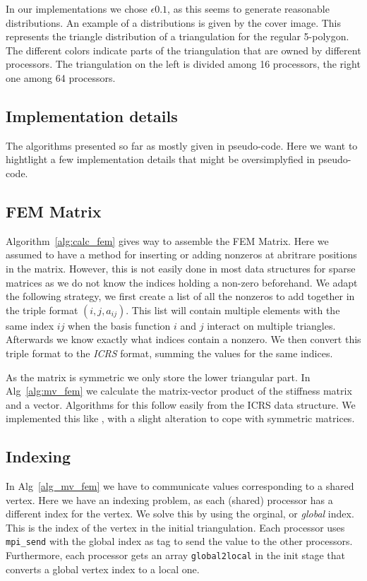 \documentclass[11pt]{amsart}
\theoremstyle{definition}
\begin{document}
In our implementations we chose $\epsilon 0.1$, as this seems to generate reasonable distributions. An example of a distributions is given by the cover image. This represents the triangle distribution of a triangulation for the  regular 5-polygon. The different colors indicate parts of the triangulation that are owned by different processors. The triangulation on the left is divided among 16 processors, the right one among 64 processors. 
\subsection{Implementation details}
The algorithms presented so far as mostly given in pseudo-code. Here we want to hightlight a few implementation details that might be oversimplyfied in pseudo-code.
\subsection*{FEM Matrix}
Algorithm~\ref{alg:calc_fem} gives way to assemble the FEM Matrix. Here
we assumed to have a method for inserting or adding nonzeros at abritrare positions in the matrix. However,
this is not easily done in most data structures for sparse matrices as we do not know the
indices holding a non-zero beforehand. We adapt the following strategy, we first create a list
of all the nonzeros to add together in the triple format $(i,j,a_{ij})$.
This list will contain multiple elements with the same index $ij$ when
the basis function $i$ and $j$ interact on multiple triangles. Afterwards we know
exactly what indices contain a nonzero. We then convert this triple format to the \emph{ICRS}
\cite[p.~171]{biss04} format, summing the values for the same indices.

As the matrix is symmetric we only store the lower triangular part. In Alg~\ref{alg:mv_fem}
we calculate the matrix-vector product of the stiffness matrix and a vector. Algorithms for this
follow easily from the ICRS data structure. We implemented this like \cite[Algorithm~4.4]{biss04}, with
a slight alteration to cope with symmetric matrices.

\subsection*{Indexing}
In Alg~\ref{alg_mv_fem} we have to communicate values corresponding to a shared vertex. Here we have an indexing problem, as each (shared) processor has a different index for the vertex. We solve this by using the orginal, or \emph{global} index. This is the index of the vertex in the initial triangulation. Each processor uses \verb=mpi_send= with the global index as tag to send the value to the other processors. Furthermore, each processor gets an array \verb=global2local= in the init stage that converts a global vertex index to a local one.
\end{document}

